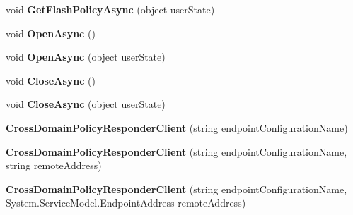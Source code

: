 \begin{DoxyCompactItemize}
\item 
\hypertarget{class_cross_domain_policy_responder_client_a4c07ab986ee8a200d441434c1fb81cfa}{
void {\bfseries GetFlashPolicyAsync} (object userState)}
\label{class_cross_domain_policy_responder_client_a4c07ab986ee8a200d441434c1fb81cfa}

\item 
\hypertarget{class_cross_domain_policy_responder_client_a9e5c1d1298125952ed3b99aa402c5af5}{
void {\bfseries OpenAsync} ()}
\label{class_cross_domain_policy_responder_client_a9e5c1d1298125952ed3b99aa402c5af5}

\item 
\hypertarget{class_cross_domain_policy_responder_client_ae89e8766c64ccc9a78707686f65c4af5}{
void {\bfseries OpenAsync} (object userState)}
\label{class_cross_domain_policy_responder_client_ae89e8766c64ccc9a78707686f65c4af5}

\item 
\hypertarget{class_cross_domain_policy_responder_client_ab15a4cca0d395c15bd0f2c29b620a4db}{
void {\bfseries CloseAsync} ()}
\label{class_cross_domain_policy_responder_client_ab15a4cca0d395c15bd0f2c29b620a4db}

\item 
\hypertarget{class_cross_domain_policy_responder_client_a0198562d78b04ec1f5590dd27a3e4943}{
void {\bfseries CloseAsync} (object userState)}
\label{class_cross_domain_policy_responder_client_a0198562d78b04ec1f5590dd27a3e4943}

\item 
\hypertarget{class_cross_domain_policy_responder_client_a5bb8ef77ac406eea2c2ebfa219dc4c90}{
{\bfseries CrossDomainPolicyResponderClient} (string endpointConfigurationName)}
\label{class_cross_domain_policy_responder_client_a5bb8ef77ac406eea2c2ebfa219dc4c90}

\item 
\hypertarget{class_cross_domain_policy_responder_client_a6d7837d62f46c79003208caf6c9e4277}{
{\bfseries CrossDomainPolicyResponderClient} (string endpointConfigurationName, string remoteAddress)}
\label{class_cross_domain_policy_responder_client_a6d7837d62f46c79003208caf6c9e4277}

\item 
\hypertarget{class_cross_domain_policy_responder_client_a736bba2a16e80787c7297484d6f9ddba}{
{\bfseries CrossDomainPolicyResponderClient} (string endpointConfigurationName, System.ServiceModel.EndpointAddress remoteAddress)}
\label{class_cross_domain_policy_responder_client_a736bba2a16e80787c7297484d6f9ddba}


\end{DoxyCompactItemize}
